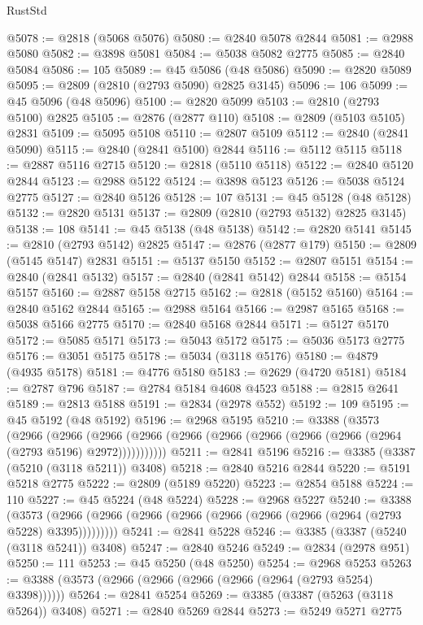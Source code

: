 \begin{lexlean}{RustStd}
\begin{coremodule}
@5078 := @2818 (@5068 @5076)
@5080 := @2840 @5078 @2844
@5081 := @2988 @5080
@5082 := @3898 @5081
@5084 := @5038 @5082 @2775
@5085 := @2840 @5084
@5086 := 105
@5089 := @45 @5086 (@48 @5086)
@5090 := @2820 @5089
@5095 := @2809 (@2810 (@2793 @5090) @2825 @3145)
@5096 := 106
@5099 := @45 @5096 (@48 @5096)
@5100 := @2820 @5099
@5103 := @2810 (@2793 @5100) @2825
@5105 := @2876 (@2877 @110)
@5108 := @2809 (@5103 @5105) @2831
@5109 := @5095 @5108
@5110 := @2807 @5109
@5112 := @2840 (@2841 @5090)
@5115 := @2840 (@2841 @5100) @2844
@5116 := @5112 @5115
@5118 := @2887 @5116 @2715
@5120 := @2818 (@5110 @5118)
@5122 := @2840 @5120 @2844
@5123 := @2988 @5122
@5124 := @3898 @5123
@5126 := @5038 @5124 @2775
@5127 := @2840 @5126
@5128 := 107
@5131 := @45 @5128 (@48 @5128)
@5132 := @2820 @5131
@5137 := @2809 (@2810 (@2793 @5132) @2825 @3145)
@5138 := 108
@5141 := @45 @5138 (@48 @5138)
@5142 := @2820 @5141
@5145 := @2810 (@2793 @5142) @2825
@5147 := @2876 (@2877 @179)
@5150 := @2809 (@5145 @5147) @2831
@5151 := @5137 @5150
@5152 := @2807 @5151
@5154 := @2840 (@2841 @5132)
@5157 := @2840 (@2841 @5142) @2844
@5158 := @5154 @5157
@5160 := @2887 @5158 @2715
@5162 := @2818 (@5152 @5160)
@5164 := @2840 @5162 @2844
@5165 := @2988 @5164
@5166 := @2987 @5165
@5168 := @5038 @5166 @2775
@5170 := @2840 @5168 @2844
@5171 := @5127 @5170
@5172 := @5085 @5171
@5173 := @5043 @5172
@5175 := @5036 @5173 @2775
@5176 := @3051 @5175
@5178 := @5034 (@3118 @5176)
@5180 := @4879 (@4935 @5178)
@5181 := @4776 @5180
@5183 := @2629 (@4720 @5181)
@5184 := @2787 @796
@5187 := @2784 @5184 @4608 @4523
@5188 := @2815 @2641
@5189 := @2813 @5188
@5191 := @2834 (@2978 @552)
@5192 := 109
@5195 := @45 @5192 (@48 @5192)
@5196 := @2968 @5195
@5210 := @3388
    (@3573
      (@2966
        (@2966
          (@2966 (@2966 (@2966 (@2966 (@2966 (@2966 (@2966 (@2964 (@2793 @5196) @2972)))))))))))
@5211 := @2841 @5196
@5216 := @3385 (@3387 (@5210 (@3118 @5211)) @3408)
@5218 := @2840 @5216 @2844
@5220 := @5191 @5218 @2775
@5222 := @2809 (@5189 @5220)
@5223 := @2854 @5188
@5224 := 110
@5227 := @45 @5224 (@48 @5224)
@5228 := @2968 @5227
@5240 := @3388
    (@3573 (@2966 (@2966 (@2966 (@2966 (@2966 (@2966 (@2966 (@2964 (@2793 @5228) @3395)))))))))
@5241 := @2841 @5228
@5246 := @3385 (@3387 (@5240 (@3118 @5241)) @3408)
@5247 := @2840 @5246
@5249 := @2834 (@2978 @951)
@5250 := 111
@5253 := @45 @5250 (@48 @5250)
@5254 := @2968 @5253
@5263 := @3388 (@3573 (@2966 (@2966 (@2966 (@2966 (@2964 (@2793 @5254) @3398))))))
@5264 := @2841 @5254
@5269 := @3385 (@3387 (@5263 (@3118 @5264)) @3408)
@5271 := @2840 @5269 @2844
@5273 := @5249 @5271 @2775

\end{coremodule}
\end{lexlean}
